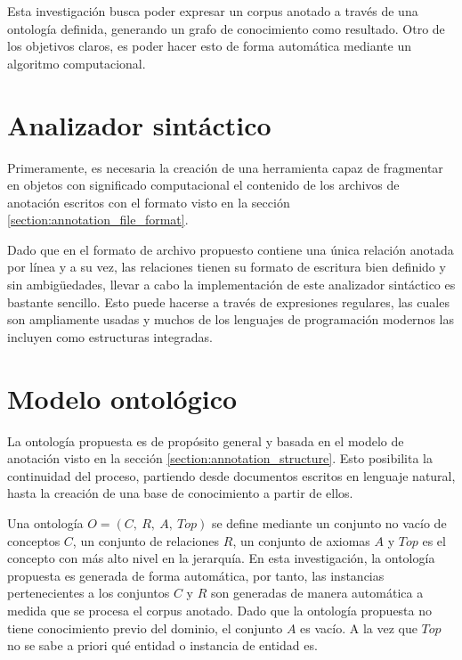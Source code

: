 \label{chapter:proposed_solution}
\vspace{-0.3in}
Esta investigación busca poder expresar un corpus anotado a través de una ontología definida, generando un grafo de conocimiento como resultado. Otro de los objetivos claros, es poder hacer esto de forma automática mediante un algoritmo computacional. 

\vspace{-0.1in}
\section{Analizador sintáctico}
\vspace{-0.1in}
Primeramente, es necesaria la creación de una herramienta capaz de fragmentar en objetos con significado computacional el contenido de los archivos de anotación escritos con el formato visto en la sección \ref{section:annotation_file_format}.

Dado que en el formato de archivo propuesto contiene una única relación anotada por línea y a su vez, las relaciones tienen su formato de escritura bien definido y sin ambigüedades, llevar a cabo la implementación de este analizador sintáctico es bastante sencillo. Esto puede hacerse a través de expresiones regulares, las cuales son ampliamente usadas y muchos de los lenguajes de programación modernos las incluyen como estructuras integradas.

\vspace{-0.1in}
\section{Modelo ontológico}
\vspace{-0.1in}
La ontología propuesta es de propósito general y basada en el modelo de anotación visto en la sección \ref{section:annotation_structure}. Esto posibilita la continuidad del proceso, partiendo desde documentos escritos en lenguaje natural, hasta la creación de una base de conocimiento a partir de ellos.

Una ontología $O=(C,~R,~A,~Top)$ se define mediante un conjunto no vacío de conceptos $C$, un conjunto de relaciones $R$, un conjunto de axiomas $A$ y $Top$ es el concepto con más alto nivel en la jerarquía. En esta investigación, la ontología propuesta es generada de forma automática, por tanto, las instancias pertenecientes a los conjuntos $C$ y $R$ son generadas de manera automática a medida que se procesa el corpus anotado. Dado que la ontología propuesta no tiene conocimiento previo del dominio, el conjunto $A$ es vacío. A la vez que $Top$ no se sabe a priori qué entidad o instancia de entidad es.

